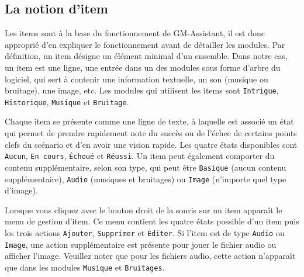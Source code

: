\documentclass[a4paper,12pt]{article}
\newcommand*{\GMA}{GM-Assistant\xspace}
\newcommand*{\interfaceitem}[1]{\texttt{#1}}
\begin{document}
\subsection{La notion d'item}
\label{item}

Les items sont à la base du fonctionnement de \GMA, il est donc approprié d'en expliquer le fonctionnement avant de détailler les modules.
Par définition, un item désigne un élément minimal d'un ensemble.
Dans notre cas, un item est une ligne, une entrée dans un des modules sous forme d'arbre du logiciel, qui sert à contenir une information textuelle, un son (musique ou bruitage), une image, etc.
Les modules qui utilisent les items sont \interfaceitem{Intrigue}, \interfaceitem{Historique}, \interfaceitem{Musique} et \interfaceitem{Bruitage}.

Chaque item se présente comme une ligne de texte, à laquelle est associé un état qui permet de prendre rapidement note du succès ou de l'échec de certains points clefs du scénario et d'en avoir une vision rapide.
Les quatre états disponibles sont \interfaceitem{Aucun}, \interfaceitem{En cours}, \interfaceitem{Échoué} et \interfaceitem{Réussi}.
Un item peut également comporter du contenu supplémentaire, selon son type, qui peut être \interfaceitem{Basique} (aucun contenu supplémentaire), \interfaceitem{Audio} (musiques et bruitages) ou \interfaceitem{Image} (n'importe quel type d'image).

Lorsque vous cliquez avec le bouton droit de la souris sur un item apparaît le menu de gestion d'item.
Ce menu contient les quatre états possible d'un item puis les trois actions \interfaceitem{Ajouter}, \interfaceitem{Supprimer} et \interfaceitem{Éditer}.
Si l'item est de type \interfaceitem{Audio} ou \interfaceitem{Image}, une action supplémentaire est présente pour jouer le fichier audio ou afficher l'image.
Veuillez noter que pour les fichiers audio, cette action n'apparaît que dans les modules \interfaceitem{Musique} et \interfaceitem{Bruitages}.
\end{document}
